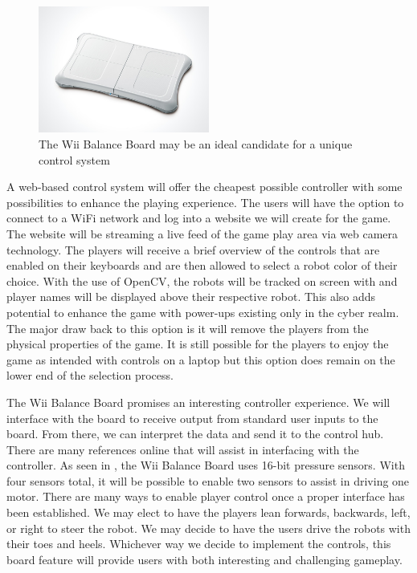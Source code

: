 \documentclass[11pt]{ieeeconf}
\begin{document}
\begin{figure}[H]
\centering
\captionsetup{justification=centering}
\includegraphics[width=0.5\textwidth]{images/wii.jpg}
\caption{The Wii Balance Board may be an ideal candidate for a unique control system \cite{wiiboard:19}}
\label{Wii}
\end{figure}

A web-based control system will offer the cheapest possible controller with some possibilities to enhance the playing experience. The users will have the option to connect to a WiFi network and log into a website we will create for the game. The website will be streaming a live feed of the game play area via web camera technology. The players will receive a brief overview of the controls that are enabled on their keyboards and are then allowed to select a robot color of their choice. With the use of OpenCV, the robots will be tracked on screen with and player names will be displayed above their respective robot. This also adds potential to enhance the game with power-ups existing only in the cyber realm. The major draw back to this option is it will remove the players from the physical properties of the game. It is still possible for the players to enjoy the game as intended with controls on a laptop but this option does remain on the lower end of the selection process. 

The Wii Balance Board promises an interesting controller experience. We will interface with the board to receive output from standard user inputs to the board. From there, we can interpret the data and send it to the control hub. There are many references online that will assist in interfacing with the controller. As seen in \cite{homebrew}, the Wii Balance Board uses 16-bit pressure sensors. With four sensors total, it will be possible to enable two sensors to assist in driving one motor. There are many ways to enable player control once a proper interface has been established. We may elect to have the players lean forwards, backwards, left, or right to steer the robot. We may decide to have the users drive the robots with their toes and heels. Whichever way we decide to implement the controls, this board feature will provide users with both interesting and challenging gameplay. 
\end{document}
